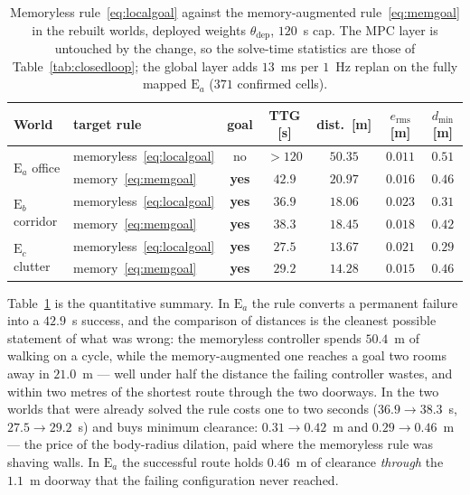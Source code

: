\documentclass[11pt,a4paper]{article}
\newcommand{\thst}{\theta_{\mathrm{dep}}}
\begin{document}
\begin{table}[htbp]
  \centering
  \small
  \caption{Memoryless rule~\eqref{eq:localgoal} against the memory-augmented rule~\eqref{eq:memgoal} in the
  rebuilt worlds, deployed weights $\thst$, $120$~s cap. The MPC layer is untouched by the change, so the
  solve-time statistics are those of Table~\ref{tab:closedloop}; the global layer adds $13$~ms per $1$~Hz
  replan on the fully mapped $\mathrm{E}_a$ ($371$ confirmed cells).}
  \label{tab:memoryfix}
  \begin{tabular}{llccccc}
    \toprule
    World & target rule & goal & TTG [s] & dist.\ [m] & $e_{\mathrm{rms}}$ [m] & $d_{\min}$ [m] \\
    \midrule
    \multirow{2}{*}{$\mathrm{E}_a$ office}
      & memoryless~\eqref{eq:localgoal} & no  & $>120$ & $50.35$ & $0.011$ & $0.51$ \\
      & memory~\eqref{eq:memgoal} & \textbf{yes} & $\mathbf{42.9}$ & $20.97$ & $0.016$ & $0.46$ \\
    \midrule
    \multirow{2}{*}{$\mathrm{E}_b$ corridor}
      & memoryless~\eqref{eq:localgoal} & \textbf{yes} & $\mathbf{36.9}$ & $18.06$ & $0.023$ & $0.31$ \\
      & memory~\eqref{eq:memgoal} & \textbf{yes} & $38.3$ & $18.45$ & $0.018$ & $0.42$ \\
    \midrule
    \multirow{2}{*}{$\mathrm{E}_c$ clutter}
      & memoryless~\eqref{eq:localgoal} & \textbf{yes} & $\mathbf{27.5}$ & $13.67$ & $0.021$ & $0.29$ \\
      & memory~\eqref{eq:memgoal} & \textbf{yes} & $29.2$ & $14.28$ & $0.015$ & $0.46$ \\
    \bottomrule
  \end{tabular}
\end{table}

Table~\ref{tab:memoryfix} is the quantitative summary. In $\mathrm{E}_a$ the rule converts a permanent
failure into a $42.9$~s success, and the comparison of distances is the cleanest possible statement of what
was wrong: the memoryless controller spends $50.4$~m of walking on a cycle, while the memory-augmented one
reaches a goal two rooms away in $21.0$~m --- well under half the distance the failing controller wastes,
and within two metres of the shortest route through the two doorways. In the two worlds that were already
solved the rule costs one to two seconds ($36.9\to38.3$~s, $27.5\to29.2$~s) and buys minimum clearance:
$0.31\to0.42$~m and $0.29\to0.46$~m --- the price of the body-radius dilation, paid where the memoryless
rule was shaving walls. In $\mathrm{E}_a$ the successful route holds $0.46$~m of clearance \emph{through}
the $1.1$~m doorway that the failing configuration never reached.
\end{document}
